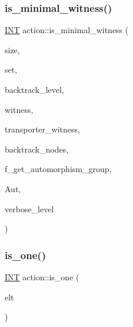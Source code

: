 \subsubsection{\texorpdfstring{is\+\_\+minimal\+\_\+witness()}{is\_minimal\_witness()}}
{\footnotesize\ttfamily \mbox{\hyperlink{galois_8h_a09fddde158a3a20bd2dcadb609de11dc}{I\+NT}} action\+::is\+\_\+minimal\+\_\+witness (\begin{DoxyParamCaption}\item[{\mbox{\hyperlink{galois_8h_a09fddde158a3a20bd2dcadb609de11dc}{I\+NT}}}]{size,  }\item[{\mbox{\hyperlink{galois_8h_a09fddde158a3a20bd2dcadb609de11dc}{I\+NT}} $\ast$}]{set,  }\item[{\mbox{\hyperlink{galois_8h_a09fddde158a3a20bd2dcadb609de11dc}{I\+NT}} \&}]{backtrack\+\_\+level,  }\item[{\mbox{\hyperlink{galois_8h_a09fddde158a3a20bd2dcadb609de11dc}{I\+NT}} $\ast$}]{witness,  }\item[{\mbox{\hyperlink{galois_8h_a09fddde158a3a20bd2dcadb609de11dc}{I\+NT}} $\ast$}]{transporter\+\_\+witness,  }\item[{\mbox{\hyperlink{galois_8h_a09fddde158a3a20bd2dcadb609de11dc}{I\+NT}} \&}]{backtrack\+\_\+nodes,  }\item[{\mbox{\hyperlink{galois_8h_a09fddde158a3a20bd2dcadb609de11dc}{I\+NT}}}]{f\+\_\+get\+\_\+automorphism\+\_\+group,  }\item[{\mbox{\hyperlink{classsims}{sims}} \&}]{Aut,  }\item[{\mbox{\hyperlink{galois_8h_a09fddde158a3a20bd2dcadb609de11dc}{I\+NT}}}]{verbose\+\_\+level }\end{DoxyParamCaption})}

\mbox{\label{classaction_a8c29d83d2e0d0bf5222e3699d6754580}} 
\subsubsection{\texorpdfstring{is\+\_\+one()}{is\_one()}}
{\footnotesize\ttfamily \mbox{\hyperlink{galois_8h_a09fddde158a3a20bd2dcadb609de11dc}{I\+NT}} action\+::is\+\_\+one (\begin{DoxyParamCaption}\item[{void $\ast$}]{elt }\end{DoxyParamCaption})}

\mbox{\label{classaction_a5f37807b5b9d6f153814984fffd38bf3}} 
